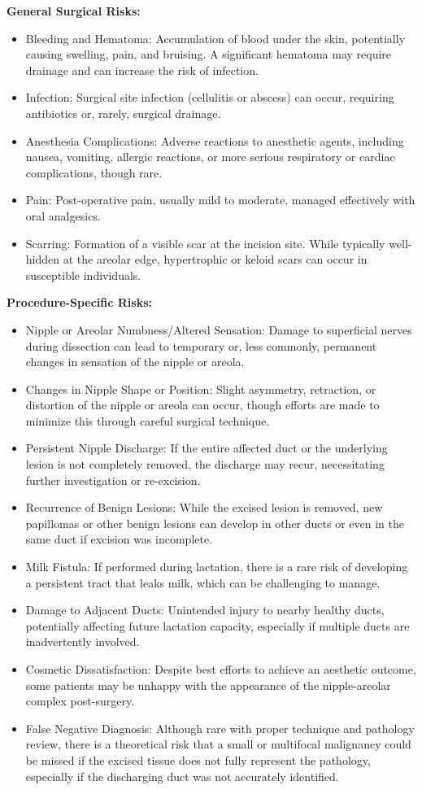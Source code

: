 \textbf{General Surgical Risks:}
\begin{itemize}
  \item Bleeding and Hematoma: Accumulation of blood under the skin, potentially causing swelling, pain, and bruising. A significant hematoma may require drainage and can increase the risk of infection.
  \item Infection: Surgical site infection (cellulitis or abscess) can occur, requiring antibiotics or, rarely, surgical drainage.
  \item Anesthesia Complications: Adverse reactions to anesthetic agents, including nausea, vomiting, allergic reactions, or more serious respiratory or cardiac complications, though rare.
  \item Pain: Post-operative pain, usually mild to moderate, managed effectively with oral analgesics.
  \item Scarring: Formation of a visible scar at the incision site. While typically well-hidden at the areolar edge, hypertrophic or keloid scars can occur in susceptible individuals.
\end{itemize}

\textbf{Procedure-Specific Risks:}
\begin{itemize}
  \item Nipple or Areolar Numbness/Altered Sensation: Damage to superficial nerves during dissection can lead to temporary or, less commonly, permanent changes in sensation of the nipple or areola.
  \item Changes in Nipple Shape or Position: Slight asymmetry, retraction, or distortion of the nipple or areola can occur, though efforts are made to minimize this through careful surgical technique.
  \item Persistent Nipple Discharge: If the entire affected duct or the underlying lesion is not completely removed, the discharge may recur, necessitating further investigation or re-excision.
  \item Recurrence of Benign Lesions: While the excised lesion is removed, new papillomas or other benign lesions can develop in other ducts or even in the same duct if excision was incomplete.
  \item Milk Fistula: If performed during lactation, there is a rare risk of developing a persistent tract that leaks milk, which can be challenging to manage.
  \item Damage to Adjacent Ducts: Unintended injury to nearby healthy ducts, potentially affecting future lactation capacity, especially if multiple ducts are inadvertently involved.
  \item Cosmetic Dissatisfaction: Despite best efforts to achieve an aesthetic outcome, some patients may be unhappy with the appearance of the nipple-areolar complex post-surgery.
  \item False Negative Diagnosis: Although rare with proper technique and pathology review, there is a theoretical risk that a small or multifocal malignancy could be missed if the excised tissue does not fully represent the pathology, especially if the discharging duct was not accurately identified.
\end{itemize}

